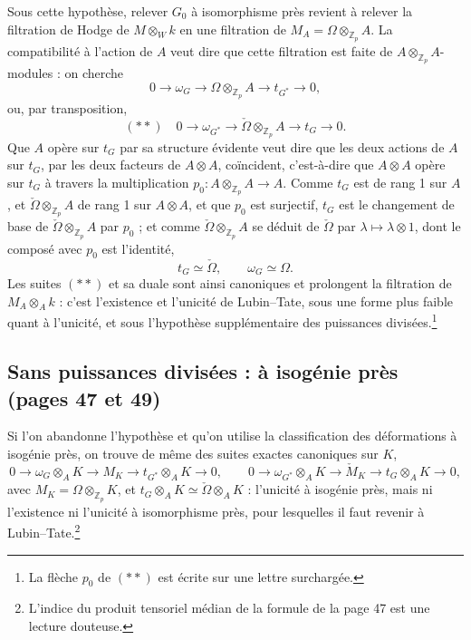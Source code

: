 \documentclass[11pt,a4paper]{article}
\begin{document}
Sous cette hypothèse, relever $G_{0}$ à isomorphisme près revient à relever
la filtration de Hodge de $M \otimes_{W} k$ en une filtration de
$M_{A} = \Omega \otimes_{\mathbb{Z}_{p}} A$. La compatibilité à l'action de
$A$ veut dire que cette filtration est faite de
$A \otimes_{\mathbb{Z}_{p}} A$-modules : on cherche
\[
0 \to \omega_{G} \to \Omega \otimes_{\mathbb{Z}_{p}} A \to t_{G^{*}} \to 0,
\]
ou, par transposition,
\[
(**) \quad 0 \to \omega_{G^{*}} \to \check\Omega \otimes_{\mathbb{Z}_{p}} A
\to t_{G} \to 0 .
\]
Que $A$ opère sur $t_{G}$ par sa structure évidente veut dire que les deux
actions de $A$ sur $t_{G}$, par les deux facteurs de $A \otimes A$,
coïncident, c'est-à-dire que $A \otimes A$ opère sur $t_{G}$ à travers la
multiplication $p_{0}\colon A \otimes_{\mathbb{Z}_{p}} A \to A$. Comme $t_{G}$
est de rang 1 sur $A$, et $\check\Omega \otimes_{\mathbb{Z}_{p}} A$ de rang 1
sur $A \otimes A$, et que $p_{0}$ est surjectif, $t_{G}$ est le changement de
base de $\check\Omega \otimes_{\mathbb{Z}_{p}} A$ par $p_{0}$ ; et comme
$\check\Omega \otimes_{\mathbb{Z}_{p}} A$ se déduit de $\check\Omega$ par
$\lambda \mapsto \lambda \otimes 1$, dont le composé avec $p_{0}$ est
l'identité,
\[
t_{G} \simeq \check\Omega, \qquad \omega_{G} \simeq \Omega .
\]
Les suites $(**)$ et sa duale sont ainsi canoniques et prolongent la
filtration de $M_{A} \otimes_{A} k$ : c'est l'existence et l'unicité de
Lubin--Tate, sous une forme plus faible quant à l'unicité, et sous
l'hypothèse supplémentaire des puissances divisées.\footnote{La flèche
$p_{0}$ de $(**)$ est écrite sur une lettre surchargée.}

\subsection*{Sans puissances divisées : à isogénie près (pages 47 et 49)}

Si l'on abandonne l'hypothèse et qu'on utilise la classification des
déformations à isogénie près, on trouve de même des suites exactes
canoniques sur $K$,
\[
0 \to \omega_{G} \otimes_{A} K \to M_{K} \to t_{G^{*}} \otimes_{A} K \to 0,
\qquad
0 \to \omega_{G^{*}} \otimes_{A} K \to \check M_{K} \to t_{G} \otimes_{A} K
\to 0,
\]
avec $M_{K} = \Omega \otimes_{\mathbb{Z}_{p}} K$, et $t_{G} \otimes_{A} K
\simeq \check\Omega \otimes_{A} K$ : l'unicité à isogénie près, mais ni
l'existence ni l'unicité à isomorphisme près, pour lesquelles il faut
revenir à Lubin--Tate.\footnote{L'indice du produit tensoriel médian de la
formule de la page 47 est une lecture douteuse.}
\end{document}
